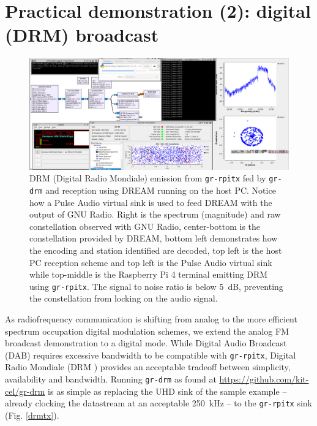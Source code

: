\documentclass{article}
\begin{document}
\section{Practical demonstration (2): digital (DRM) broadcast}

\begin{figure}
\includegraphics[width=\linewidth]{2021-05-05-072649_2624x900_scrot.png}
\caption{DRM (Digital Radio Mondiale) emission from {\tt gr-rpitx} fed
by {\tt gr-drm} and reception using DREAM running on the host PC. Notice how
a Pulse Audio virtual sink is used to feed DREAM with the output of GNU Radio.
Right is the spectrum (magnitude) and raw constellation observed with GNU Radio,
center-bottom is the constellation provided by DREAM, bottom left demonstrates
how the encoding and station identified are decoded, top left is the host PC
reception scheme and top left is the Pulse Audio virtual sink while top-middle is
the Raspberry Pi 4 terminal emitting DRM using {\tt gr-rpitx}. The signal to noise
ratio is below 5~dB, preventing the constellation from locking on the audio signal.}
\label{drm}
\end{figure}

As radiofrequency communication is shifting from analog to the more
efficient spectrum occupation digital modulation schemes, we extend
the analog FM broadcast demonstration to a digital mode. While Digital
Audio Broadcast (DAB) requires excessive bandwidth to be compatible
with {\tt gr-rpitx}, Digital Radio Mondiale (DRM \cite{drm}) provides an acceptable
tradeoff between simplicity, availability and bandwidth. Running {\tt gr-drm}
as found at \url{https://github.com/kit-cel/gr-drm} is as simple as replacing
the UHD sink of the sample example -- already clocking the datastream at
an acceptable 250~kHz -- to the {\tt gr-rpitx} sink (Fig. \ref{drmtx}). 
\end{document}
